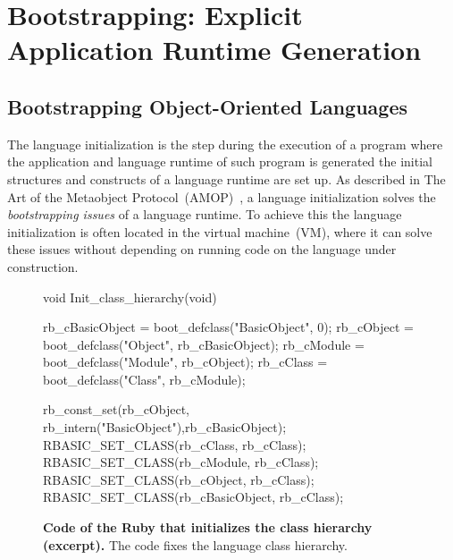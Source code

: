 
\part{Bootstrapping: Explicit Application Runtime Generation}
\chapter{Bootstrapping Object-Oriented Languages}
\minitoc
\introduction

The language initialization is the step during the execution of a program where the application and language runtime of such program is generated \ie the initial structures and constructs of a language runtime are set up.
As described in The Art of the Metaobject Protocol~(AMOP)~\cite{Kicz91a}, a language initialization solves the \emph{bootstrapping issues} of a language runtime. To achieve this the language initialization is often located in the virtual machine~(VM), where it can solve these issues without depending on running code on the language under construction.

\begin{figure}[ht!]
\begin{code}
void Init_class_hierarchy(void) {
    rb_cBasicObject = boot_defclass("BasicObject", 0);
    rb_cObject = boot_defclass("Object", rb_cBasicObject);
    rb_cModule = boot_defclass("Module", rb_cObject);
    rb_cClass =  boot_defclass("Class",  rb_cModule);

    rb_const_set(rb_cObject, rb_intern("BasicObject"),rb_cBasicObject);
    RBASIC_SET_CLASS(rb_cClass, rb_cClass);
    RBASIC_SET_CLASS(rb_cModule, rb_cClass);
    RBASIC_SET_CLASS(rb_cObject, rb_cClass);
    RBASIC_SET_CLASS(rb_cBasicObject, rb_cClass);
}
\end{code}
\caption{\textbf{Code of the Ruby \VM that initializes the class hierarchy (excerpt).} The \VM code fixes the language class hierarchy.\label{code:ruby_hierarchy}}
\end{figure}

